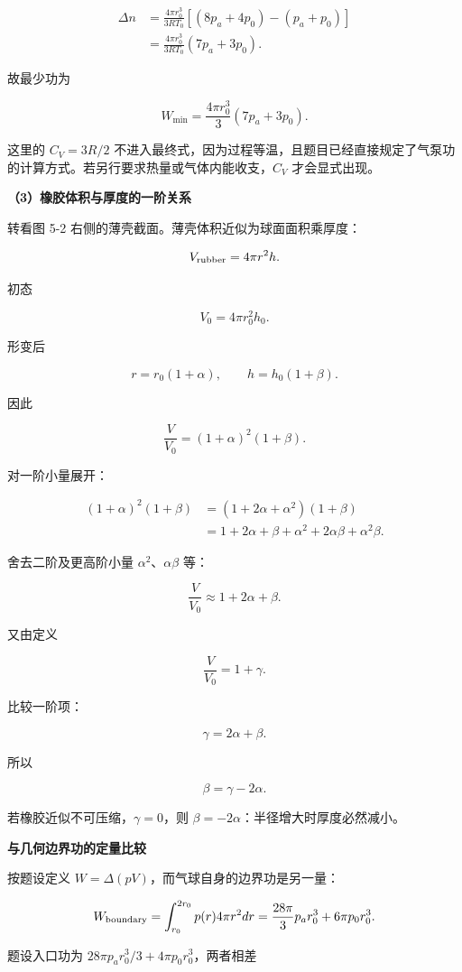 \documentclass[12pt,a4paper,UTF8]{ctexart}
\begin{document}
\[\begin{aligned}
\Delta n
&=\frac{4\pi r_0^3}{3RT_0}\left[(8p_a+4p_0)-(p_a+p_0)\right]\\
&=\frac{4\pi r_0^3}{3RT_0}(7p_a+3p_0).
\end{aligned}\]

故最少功为

\[\boxed{
W_{\min}=\frac{4\pi r_0^3}{3}(7p_a+3p_0)
}.\]

这里的 \(C_V=3R/2\)
不进入最终式，因为过程等温，且题目已经直接规定了气泵功的计算方式。若另行要求热量或气体内能收支，\(C_V\)
才会显式出现。

\textbf{（3）橡胶体积与厚度的一阶关系}

转看图 5-2 右侧的薄壳截面。薄壳体积近似为球面面积乘厚度：

\[V_{\rm rubber}=4\pi r^2h.\]

初态

\[V_0=4\pi r_0^2h_0.\]

形变后

\[r=r_0(1+\alpha),\qquad h=h_0(1+\beta).\]

因此

\[\frac{V}{V_0}=(1+\alpha)^2(1+\beta).\]

对一阶小量展开：

\[\begin{aligned}
(1+\alpha)^2(1+\beta)
&=(1+2\alpha+\alpha^2)(1+\beta)\\
&=1+2\alpha+\beta+\alpha^2+2\alpha\beta+\alpha^2\beta.
\end{aligned}\]

舍去二阶及更高阶小量 \(\alpha^2\)、\(\alpha\beta\) 等：

\[\frac{V}{V_0}\approx1+2\alpha+\beta.\]

又由定义

\[\frac{V}{V_0}=1+\gamma.\]

比较一阶项：

\[\gamma=2\alpha+\beta.\]

所以

\[\boxed{\beta=\gamma-2\alpha}.\]

若橡胶近似不可压缩，\(\gamma=0\)，则
\(\beta=-2\alpha\)：半径增大时厚度必然减小。

\textbf{与几何边界功的定量比较}

按题设定义 \(W=\Delta(pV)\)，而气球自身的边界功是另一量：

\[W_{\rm boundary}=\int_{r_0}^{2r_0}p(r)4\pi r^2dr
=\frac{28\pi}{3}p_ar_0^3+6\pi p_0r_0^3.\]

题设入口功为 \(28\pi p_ar_0^3/3+4\pi p_0r_0^3\)，两者相差
\end{document}
